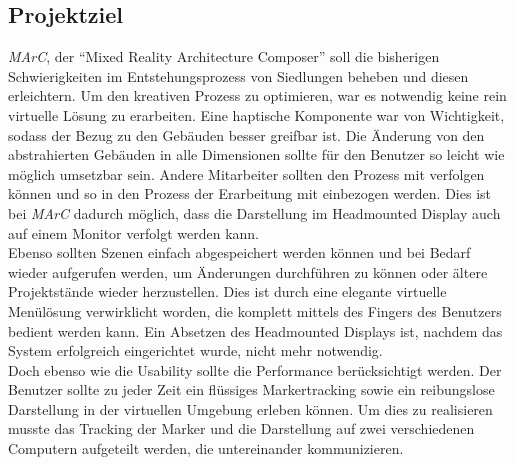 \subsection{Projektziel}\label{sec:Projektziel}
\textit{MArC}, der "`Mixed Reality Architecture Composer"' soll die bisherigen Schwierigkeiten im Entstehungsprozess von Siedlungen beheben und diesen erleichtern. 
Um den kreativen Prozess zu optimieren, war es notwendig keine rein virtuelle Lösung zu erarbeiten. Eine haptische Komponente war von Wichtigkeit, sodass der Bezug zu den Gebäuden besser greifbar ist. Die Änderung von den abstrahierten Gebäuden in alle Dimensionen sollte für den Benutzer so leicht wie möglich umsetzbar sein. Andere Mitarbeiter sollten den Prozess mit verfolgen können und so in den Prozess der Erarbeitung mit einbezogen werden. Dies ist bei \textit{MArC} dadurch möglich, dass die Darstellung im Headmounted Display auch auf einem Monitor verfolgt werden kann. \\
Ebenso sollten Szenen einfach abgespeichert werden können und bei Bedarf wieder aufgerufen werden, um Änderungen durchführen zu können oder ältere Projektstände wieder herzustellen. Dies ist durch eine elegante virtuelle Menülösung verwirklicht worden, die komplett mittels des Fingers des Benutzers bedient werden kann. Ein Absetzen des Headmounted Displays ist, nachdem das System erfolgreich eingerichtet wurde, nicht mehr notwendig.\\
Doch ebenso wie die Usability sollte die Performance berücksichtigt werden. Der Benutzer sollte zu jeder Zeit ein flüssiges Markertracking sowie ein reibungslose Darstellung in der virtuellen Umgebung erleben können. Um dies zu realisieren musste das Tracking der Marker und die Darstellung auf zwei verschiedenen Computern aufgeteilt werden, die untereinander kommunizieren.\\























